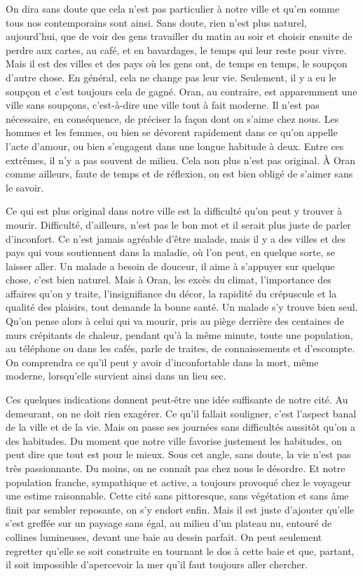 \documentclass[french,twoside]{book} %
\begin{document}
On dira sans doute que cela n’est pas particulier à notre ville et qu’en somme tous nos contemporains sont ainsi. Sans doute, rien n’est plus naturel, aujourd’hui, que de voir des gens travailler du matin au soir et choisir ensuite de perdre aux cartes, au café, et en bavardages, le temps qui leur reste pour vivre. Mais il est des villes et des pays où les gens ont, de temps en temps, le soupçon d’autre chose. En général, cela ne change pas leur vie. Seulement, il y a eu le soupçon et c’est toujours cela de gagné. Oran, au contraire, est apparemment une ville sans soupçons, c’est-à-dire une ville tout à fait moderne. Il n’est pas nécessaire, en conséquence, de préciser la façon dont on s’aime chez nous. Les hommes et les femmes, ou bien se dévorent rapidement dans ce qu’on appelle l’acte d’amour, ou bien s’engagent dans une longue habitude à deux. Entre ces extrêmes, il n’y a pas souvent de milieu. Cela non plus n’est pas original. À Oran comme ailleurs, faute de temps et de réflexion, on est bien obligé de s’aimer sans le savoir.\par
Ce qui est plus original dans notre ville est la difficulté qu’on peut y trouver à mourir. Difficulté, d’ailleurs, n’est pas le bon mot et il serait plus juste de parler d’inconfort. Ce n’est jamais agréable d’être malade, mais il y a des villes et des pays qui vous soutiennent dans la maladie, où l’on peut, en quelque sorte, se laisser aller. Un malade a besoin de douceur, il aime à s’appuyer sur quelque chose, c’est bien naturel. Mais à Oran, les excès du climat, l’importance des affaires qu’on y traite, l’insignifiance du décor, la rapidité du crépuscule et la qualité des plaisirs, tout demande la bonne santé. Un malade s’y trouve bien seul. Qu’on pense alors à celui qui va mourir, pris au piège derrière des centaines de murs crépitants de chaleur, pendant qu’à la même minute, toute une population, au téléphone ou dans les cafés, parle de traites, de connaissements et d’escompte. On comprendra ce qu’il peut y avoir d’inconfortable dans la mort, même moderne, lorsqu’elle survient ainsi dans un lieu sec.\par
Ces quelques indications donnent peut-être une idée suffisante de notre cité. Au demeurant, on ne doit rien exagérer. Ce qu’il fallait souligner, c’est l’aspect banal de la ville et de la vie. Mais on passe ses journées sans difficultés aussitôt qu’on a des habitudes. Du moment que notre ville favorise justement les habitudes, on peut dire que tout est pour le mieux. Sous cet angle, sans doute, la vie n’est pas très passionnante. Du moins, on ne connaît pas chez nous le désordre. Et notre population franche, sympathique et active, a toujours provoqué chez le voyageur une estime raisonnable. Cette cité sans pittoresque, sans végétation et sans âme finit par sembler reposante, on s’y endort enfin. Mais il est juste d’ajouter qu’elle s’est greffée sur un paysage sans égal, au milieu d’un plateau nu, entouré de collines lumineuses, devant une baie au dessin parfait. On peut seulement regretter qu’elle se soit construite en tournant le dos à cette baie et que, partant, il soit impossible d’apercevoir la mer qu’il faut toujours aller chercher.\par
\end{document}
